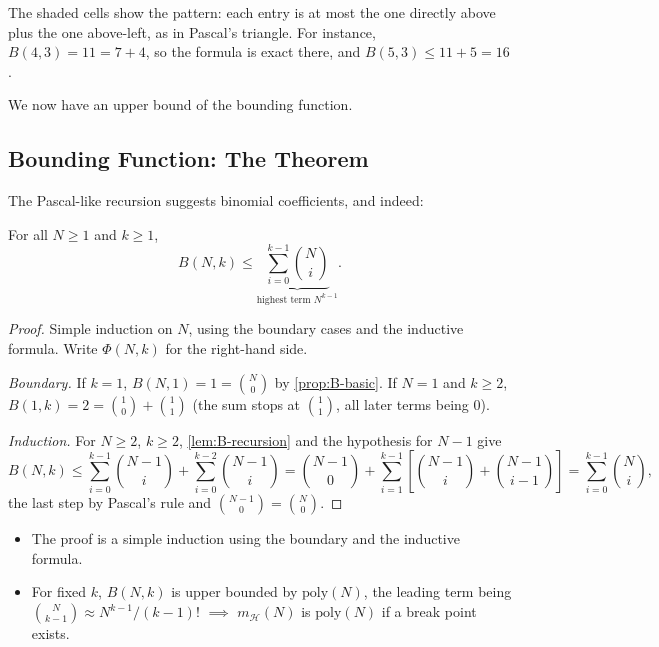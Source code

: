 The shaded cells show the pattern: each entry is at most the one directly
above plus the one above-left, as in Pascal's triangle. For instance,
\(B(4, 3) = 11 = 7 + 4\), so the formula is exact there, and
\(B(5, 3) \le 11 + 5 = 16\).

\begin{moral}
    We now have an upper bound of the bounding function.
\end{moral}

\subsection{Bounding Function: The Theorem}

The Pascal-like recursion suggests binomial coefficients, and indeed:

\begin{theorem}\label{thm:bounding}
    For all \(N \ge 1\) and \(k \ge 1\),
    \[
        B(N, k) \le \underbrace{\sum_{i=0}^{k-1} \binom{N}{i}}_{\text{highest
        term } N^{k-1}} .
    \]
\end{theorem}

\begin{proof}
    Simple induction on \(N\), using the boundary cases and the inductive
    formula. Write \(\Phi(N, k)\) for the right-hand side.

    \emph{Boundary.} If \(k = 1\), \(B(N, 1) = 1 = \binom{N}{0}\) by
    \autoref{prop:B-basic}. If \(N = 1\) and \(k \ge 2\), \(B(1, k) = 2 =
    \binom{1}{0} + \binom{1}{1}\) (the sum stops at \(\binom{1}{1}\), all later
    terms being \(0\)).

    \emph{Induction.} For \(N \ge 2\), \(k \ge 2\), \autoref{lem:B-recursion}
    and the hypothesis for \(N - 1\) give
    \[
        B(N, k) \le \sum_{i=0}^{k-1} \binom{N-1}{i}
        + \sum_{i=0}^{k-2} \binom{N-1}{i}
        = \binom{N-1}{0} + \sum_{i=1}^{k-1}
        \left[ \binom{N-1}{i} + \binom{N-1}{i-1} \right]
        = \sum_{i=0}^{k-1} \binom{N}{i} ,
    \]
    the last step by Pascal's rule and \(\binom{N-1}{0} = \binom{N}{0}\).
\end{proof}

\begin{itemize}
    \item The proof is a simple induction using the boundary and the inductive
        formula.
    \item For fixed \(k\), \(B(N, k)\) is upper bounded by \(\mathrm{poly}(N)\),
        the leading term being \(\binom{N}{k-1} \approx N^{k-1} / (k-1)!\)
        \(\implies\) \(m_{\mathcal{H}}(N)\) is \(\mathrm{poly}(N)\) if a break
        point exists.
\end{itemize}

